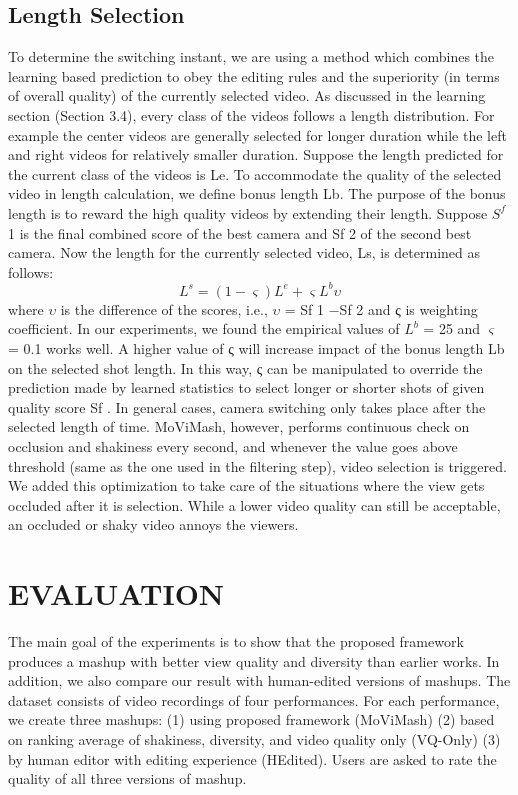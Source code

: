 \documentclass{sig-alternate}
\begin{document}
{{{\subsection{Length Selection}
To determine the switching instant, we are using a method which
combines the learning based prediction to obey the editing rules and
the superiority (in terms of overall quality) of the currently selected
video. As discussed in the learning section (Section 3.4), every
class of the videos follows a length distribution. For example the
center videos are generally selected for longer duration while the
left and right videos for relatively smaller duration.
Suppose the length predicted for the current class of the videos
is Le. To accommodate the quality of the selected video in length
calculation, we define bonus length Lb. The purpose of the bonus
length is to reward the high quality videos by extending their length.
Suppose $S^f$
1 is the final combined score of the best camera and Sf
2
of the second best camera. Now the length for the currently selected
video, Ls, is determined as follows:
$$
  L^s=(1-\varsigma)L^e + \varsigma{L^b}\upsilon
$$
where $\upsilon$ is the difference of the scores, i.e., $\upsilon$ = Sf
1
−Sf
2 and ς is
weighting coefficient. In our experiments, we found the empirical
values of $L^b$ = 25 and $\varsigma$ = 0.1 works well. A higher value of
ς will increase impact of the bonus length Lb on the selected shot
length. In this way, ς can be manipulated to override the prediction
made by learned statistics to select longer or shorter shots of given
quality score Sf .
In general cases, camera switching only takes place after the selected
length of time. MoViMash, however, performs continuous
check on occlusion and shakiness every second, and whenever the
value goes above threshold (same as the one used in the filtering
step), video selection is triggered. We added this optimization to
take care of the situations where the view gets occluded after it is
selection. While a lower video quality can still be acceptable, an
occluded or shaky video annoys the viewers.

\section{EVALUATION}
The main goal of the experiments is to show that the proposed
framework produces a mashup with better view quality and diversity
than earlier works. In addition, we also compare our result with
human-edited versions of mashups. The dataset consists of video
recordings of four performances. For each performance, we create
three mashups: (1) using proposed framework (MoViMash) (2)
based on ranking average of shakiness, diversity, and video quality 
only (VQ-Only) (3) by human editor with editing experience (HEdited).
Users are asked to rate the quality of all three versions of
mashup.
}}}
\end{document}
